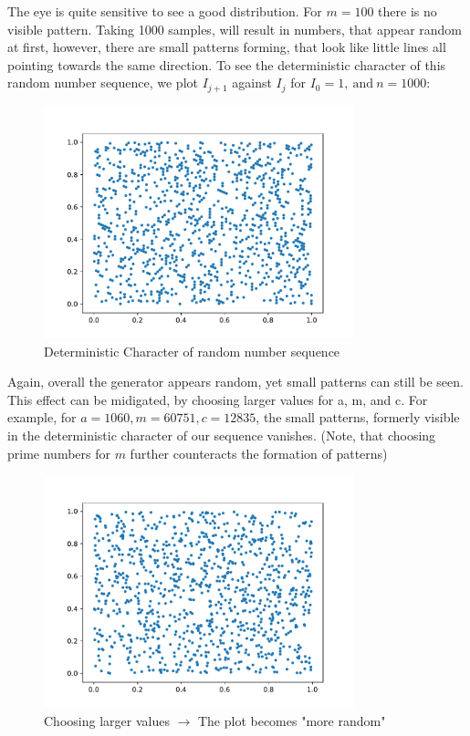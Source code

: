 \documentclass{article}
\begin{document}
The eye is quite sensitive to see a good distribution. For \( m = 100\) 
there is no visible pattern. Taking 1000 samples, will result in numbers, that
appear random at first, however, there are small patterns forming, that
look like little lines all pointing towards the same direction.
To see the deterministic character of this random number sequence, we plot
\( I _{j + 1} \) against \( I _{j} \) for \( I_0 = 1, \ \text{and} \ n = 1000 \):
\begin{figure}[H]
    \centering
    \includegraphics[width=9cm]{Fig1-3.pdf}
    \caption{Deterministic Character of random number sequence}
\end{figure}
Again, overall the generator appears random, yet small patterns can still be seen.
This effect can be midigated, by choosing larger values for a, m, and c.
For example, for \( a = 1060, m = 60751, c = 12835 \), the small patterns,
formerly visible in the deterministic character of our sequence vanishes. (Note,
that choosing prime numbers for \( m \) further counteracts the formation of
patterns)
\begin{figure}[H]
    \centering
    \includegraphics[width=9cm]{Fig1-4.pdf}
    \caption{Choosing larger values $\rightarrow$ The plot becomes "more random"}
\end{figure}
\end{document}
